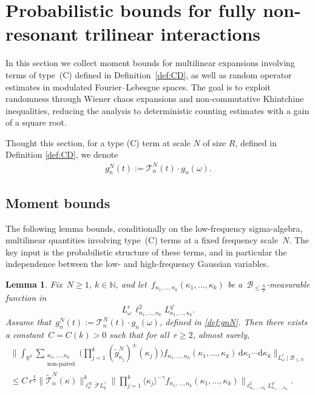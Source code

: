 \documentclass[11pt,reqno,english]{amsart}
\numberwithin{equation}{section}
\theoremstyle{plain}
\newtheorem{lemma}[theorem]{Lemma}
\theoremstyle{definition}
\theoremstyle{remark}
\newcommand{\R}{\mathbb{R}}
\newcommand{\N}{\mathbb{N}}
\begin{document}
	
	
	
	
	\section{Probabilistic bounds for fully non-resonant trilinear interactions}
\label{sec:probatool}



In this section we collect moment bounds for multilinear expansions involving terms of type~(C) defined in Definition~\ref{def:CD}, as well as random operator estimates in modulated Fourier--Lebesgue spaces.
The goal is to exploit randomness through Wiener chaos expansions and non-commutative Khintchine inequalities, reducing the analysis to deterministic counting estimates with a gain of a square root.

Thought this section, for a type (C) term at scale $N$ of size $R$, defined in Definition \ref{def:CD}, we denote
\begin{align}\label{def:gnN}
g_n^N(t):=\mathcal{T}_n^N(t)\cdot g_n(\omega).
\end{align}

\subsection{Moment bounds}

The following lemma bounds, conditionally on the low-frequency sigma-algebra, multilinear quantities involving type~(C) terms at a fixed frequency scale~$N$.
The key input is the probabilistic structure of these terms, and in particular the independence between the low- and high-frequency Gaussian variables.

\begin{lemma}\label{k-linearproba}
	Fix~$N\geq1$, $k\in\N$, and let~$f_{n_1,\dots,n_k}(\kappa_1,\dots,\kappa_k)$ be a~$\mathcal{B}_{\leq \frac{N}{2}}$-measurable function in
	\[
	L_\omega^r\,\ell_{n_1,\dots,n_k}^2 L_{\kappa_1,\dots,\kappa_k}^{q'}.
	\]
Assume that~$g_n^{N}(t):=\mathcal{T}_n^{N}(t)\cdot g_n(\omega)$, defined in \eqref{def:gnN}. 
	Then there exists a constant~$C=C(k)>0$ such that for all~$r\geq2$, almost surely,
	\begin{multline*}
		\Big\|
		\int_{\R^k}
		\sum_{\substack{n_1,\dots,n_k\\ \mathrm{non\text{-}paired}}}
		\Big(\prod_{j=1}^k (\widetilde g_{n_j}^{N})^{\pm}(\kappa_j)\Big)
		f_{n_1,\dots,n_k}(\kappa_1,\dots,\kappa_k)
		\,\mathrm{d}\kappa_1\cdots\mathrm{d}\kappa_k
		\Big\|_{L_\omega^r\mid\mathcal{B}_{\leq N}} \\
		\leq C\,r^{\frac k2}\|\widetilde{\mathcal{T}}_{n}^{N}(\kappa)\|_{\ell_n^{\infty}\widetilde{\mathcal{F}}L_q^{\gamma}}^k
		\Big\|
		\prod_{j=1}^k \langle\kappa_j\rangle^{-\gamma}
		f_{n_1,\dots,n_k}(\kappa_1,\dots,\kappa_k)
		\Big\|_{\ell_{n_1,\dots,n_k}^2 L_{\kappa_1,\dots,\kappa_k}^{q'}}.
	\end{multline*}
\end{lemma}
\end{document}
